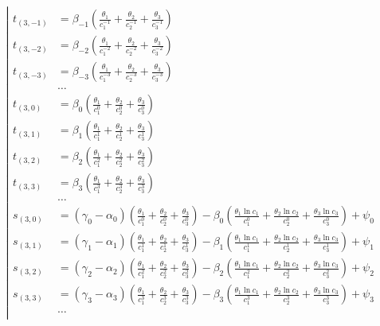 \begin{equation*} \left| \begin{aligned}
t_{(3,-1)} &=
  \beta_{-1} \left(
  \frac{\theta_1}{c_1^{-1}}
+ \frac{\theta_2}{c_2^{-1}}
+ \frac{\theta_3}{c_3^{-1}} \right) \\
%
t_{(3,-2)} &=
  \beta_{-2} \left(
  \frac{\theta_1}{c_1^{-2}}
+ \frac{\theta_2}{c_2^{-2}}
+ \frac{\theta_3}{c_3^{-2}} \right) \\
%
t_{(3,-3)} &=
  \beta_{-3} \left(
  \frac{\theta_1}{c_1^{-3}}
+ \frac{\theta_2}{c_2^{-3}}
+ \frac{\theta_3}{c_3^{-3}} \right) \\
%
&\ldots \\
%
t_{(3,0)} &=
  \beta_0 \left(
  \frac{\theta_1}{c_1^0}
+ \frac{\theta_2}{c_2^0}
+ \frac{\theta_3}{c_3^0} \right) \\
%
t_{(3,1)} &=
  \beta_1 \left(
  \frac{\theta_1}{c_1^1}
+ \frac{\theta_2}{c_2^1}
+ \frac{\theta_3}{c_3^1} \right) \\
%
t_{(3,2)} &=
  \beta_2 \left(
  \frac{\theta_1}{c_1^2}
+ \frac{\theta_2}{c_2^2}
+ \frac{\theta_3}{c_3^2} \right) \\
%
t_{(3,3)} &=
  \beta_3 \left(
  \frac{\theta_1}{c_1^3}
+ \frac{\theta_2}{c_2^3}
+ \frac{\theta_3}{c_3^3} \right) \\
%
&\ldots \\
%
s_{(3,0)} &=
  (\gamma_0 - \alpha_0) \left(
  \frac{\theta_1}{c_1^0}
+ \frac{\theta_2}{c_2^0}
+ \frac{\theta_3}{c_3^0} \right)
- \beta_0 \left(
  \frac{\theta_1 \ln{c_1}}{c_1^0}
+ \frac{\theta_2 \ln{c_2}}{c_2^0}
+ \frac{\theta_3 \ln{c_3}}{c_3^0} \right)
+ \psi_0 \\
%
s_{(3,1)} &=
  (\gamma_1 - \alpha_1) \left(
  \frac{\theta_1}{c_1^1}
+ \frac{\theta_2}{c_2^1}
+ \frac{\theta_3}{c_3^1} \right)
- \beta_1 \left(
  \frac{\theta_1 \ln{c_1}}{c_1^1}
+ \frac{\theta_2 \ln{c_2}}{c_2^1}
+ \frac{\theta_3 \ln{c_3}}{c_3^1} \right)
+ \psi_1 \\
%
s_{(3,2)} &=
  (\gamma_2 - \alpha_2) \left(
  \frac{\theta_1}{c_1^2}
+ \frac{\theta_2}{c_2^2}
+ \frac{\theta_3}{c_3^2} \right)
- \beta_2 \left(
  \frac{\theta_1 \ln{c_1}}{c_1^2}
+ \frac{\theta_2 \ln{c_2}}{c_2^2}
+ \frac{\theta_3 \ln{c_3}}{c_3^2} \right)
+ \psi_2 \\
%
s_{(3,3)} &=
  (\gamma_3 - \alpha_3) \left(
  \frac{\theta_1}{c_1^3}
+ \frac{\theta_2}{c_2^3}
+ \frac{\theta_3}{c_3^3} \right)
- \beta_3 \left(
  \frac{\theta_1 \ln{c_1}}{c_1^3}
+ \frac{\theta_2 \ln{c_2}}{c_2^3}
+ \frac{\theta_3 \ln{c_3}}{c_3^3} \right)
+ \psi_3 \\
%
&\ldots \\
\end{aligned} \right. \end{equation*}

